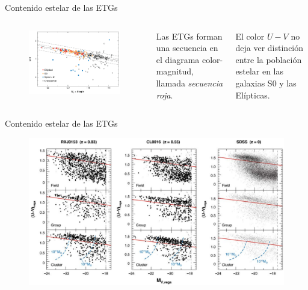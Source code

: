 \documentclass[xcolor=dvipsnames,4pt]{beamer}
\newenvironment{changemargin}[2]{%
  \begin{list}{}{%
    \setlength{\topsep}{0pt}%
    \setlength{\leftmargin}{#1}%
    \setlength{\rightmargin}{#2}%
    \setlength{\listparindent}{\parindent}%
    \setlength{\itemindent}{\parindent}%
    \setlength{\parsep}{\parskip}%
  }%
\item[]}{\end{list}}
\begin{document}
\begin{frame}{Contenido estelar de las ETGs}
\begin{changemargin}{-1cm}{-1cm}
\begin{columns}
\begin{figure}
\includegraphics[scale=0.8]{img/cmd.png}
\end{figure}
\small
Las ETGs forman una secuencia en el diagrama color-magnitud, llamada \emph{secuencia roja}.

El color $U-V$ no deja ver distinción entre la población estelar en las galaxias S0 y las Elípticas.
\end{columns}
\end{changemargin}
\end{frame}

\begin{frame}{Contenido estelar de las ETGs}
\begin{changemargin}{-1cm}{-1cm}
\begin{figure}
\includegraphics[scale=0.68]{img/cmd_z.png}
\end{figure}
\end{changemargin}
\end{frame}
\end{document}
